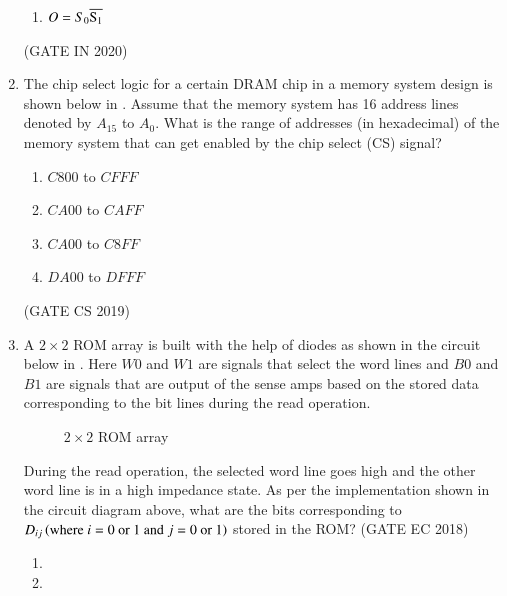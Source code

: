 \begin{enumerate}[label=\arabic*.,ref=\theenumi]
\begin{enumerate}
            \item $O=S_0\overline{\rm S _1}$
 \end{enumerate}
    \hfill (GATE IN 2020)
%
\begin{figure}[H]
	\centering
	\resizebox{0.75\columnwidth}{!}{%

	}
\caption{}
\label{fig:figure13}
\end{figure}
\item  The chip select logic for a certain DRAM chip in a memory system design is shown below
	in
.
	Assume that the memory system has 16 address lines denoted by ${A_{15}}$ to ${A_0}$. What is the range of addresses (in hexadecimal) of the memory system that can get enabled by the chip select (CS) signal?
\begin{enumerate}
\item ${C800}$ to ${CFFF}$
\item ${CA00}$ to ${CAFF}$
\item ${CA00}$ to ${C8FF}$
\item ${DA00}$ to ${DFFF}$
\end{enumerate}  
\hfill (GATE CS 2019)
%
\begin{figure}[H]

\caption{}
\label{fig:figure14}
\end{figure}
%
\item  A $2\times2$ ROM array is built with the help of diodes as shown in the circuit below
	in . Here $W0$ and $W1$ are signals that select the word lines and $B0$ and $B1$ are signals that are output of the sense amps based on the stored data corresponding to the bit lines during the read operation.
%
\begin{figure}[H]
        \centering
	\resizebox{0.75\columnwidth}{!}{%
        
	}
        \caption{ $2\times 2$ ROM array}
	\label{fig:2rom}
\end{figure}
%
		During the read operation, the selected word line goes high and the other word line is in a high impedance state. As per the implementation shown in the circuit diagram above, what are the bits corresponding to $D_{ij}\left(\text{where $i=0$ or $1$ and $j=0$ or $1$}\right)$ stored in the ROM?
	\hfill(GATE EC 2018)
	\begin{multicols}{4}
\begin{enumerate}
    \item {}
    \item {}

\end{enumerate}
\end{multicols}
\end{enumerate}
